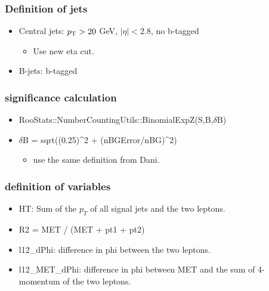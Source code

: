 \documentclass[mathserif,serif]{beamer}
\begin{document}

\begin{frame}
\frametitle{Definition of jets}
\normalsize
\begin{itemize}
\item Central jets: $p_{\text{T}}>20$ GeV, $|\eta|<2.8$, no b-tagged
\begin{itemize}
\item Use new eta cut.
\end{itemize}
\item B-jets: b-tagged
\end{itemize}
\end{frame}

\begin{frame}
\frametitle{significance calculation}
\begin{itemize}
\item RooStats::NumberCountingUtils::BinomialExpZ(S,B,$\delta$B)
\item $\delta$B = sqrt((0.25)\^{}2 + (nBGError/nBG)\^{}2)
\begin{itemize}
\item use the same definition from Dani.
\end{itemize}
\end{itemize}
\end{frame}

\begin{frame}
\frametitle{definition of variables}
\normalsize
\begin{itemize}
\item HT: Sum of the $p_T$ of all signal jets and the two leptons.
\item R2 = MET / (MET + pt1 + pt2)
\item l12\_dPhi: difference in phi between the two leptons.
\item l12\_MET\_dPhi: difference in phi between MET and the sum of 4-momentum of the two leptons.
\end{itemize}
\end{frame}
\end{document}
